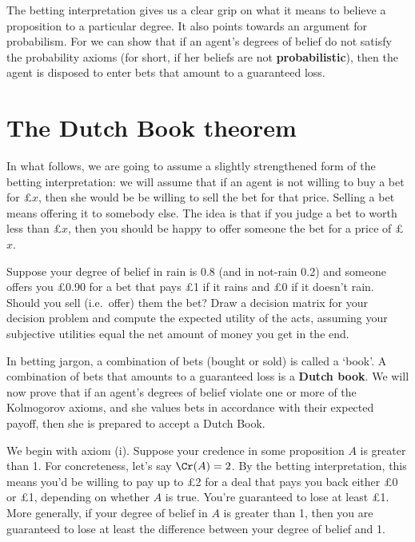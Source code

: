 The betting interpretation gives us a clear grip on what it means to
believe a proposition to a particular degree. It also points towards
an argument for probabilism. For we can show that if an agent's
degrees of belief do not satisfy the probability axioms (for short, if
her beliefs are not \textbf{probabilistic}), then the agent is
disposed to enter bets that amount to a guaranteed loss.

\section{The Dutch Book theorem}

In what follows, we are going to assume a slightly strengthened form of the
betting interpretation: we will assume that if an agent is not willing to buy a
bet for £$x$, then she would be be willing to sell the bet for that
price. Selling a bet means offering it to somebody else. The idea is that if you
judge a bet to worth less than £$x$, then you should be happy to offer someone
the bet for a price of £$x$.

\begin{exercise}{1}
  Suppose your degree of belief in rain is $0.8$ (and in not-rain 0.2)
  and someone offers you £0.90 for a bet that pays £1 if it rains and
  £0 if it doesn't rain. Should you sell (i.e.\ offer) them the bet?
  Draw a decision matrix for your decision problem and compute the
  expected utility of the acts, assuming your subjective utilities
  equal the net amount of money you get in the end.
\end{exercise}

In betting jargon, a combination of bets (bought or sold) is called a
`book'. A combination of bets that amounts to a guaranteed loss is a
\textbf{Dutch book}. We will now prove that if an agent's degrees of
belief violate one or more of the Kolmogorov axioms, and she values
bets in accordance with their expected payoff, then she is prepared to
accept a Dutch Book.

We begin with axiom (i). Suppose your credence in some proposition $A$
is greater than 1. For concreteness, let's say $\Cr(A)=2$. By the
betting interpretation, this means you'd be willing to pay up to £2
for a deal that pays you back either £0 or £1, depending on whether
$A$ is true. You're guaranteed to lose at least £1. More generally, if
your degree of belief in $A$ is greater than 1, then you are
guaranteed to lose at least the difference between your degree of
belief and 1.

